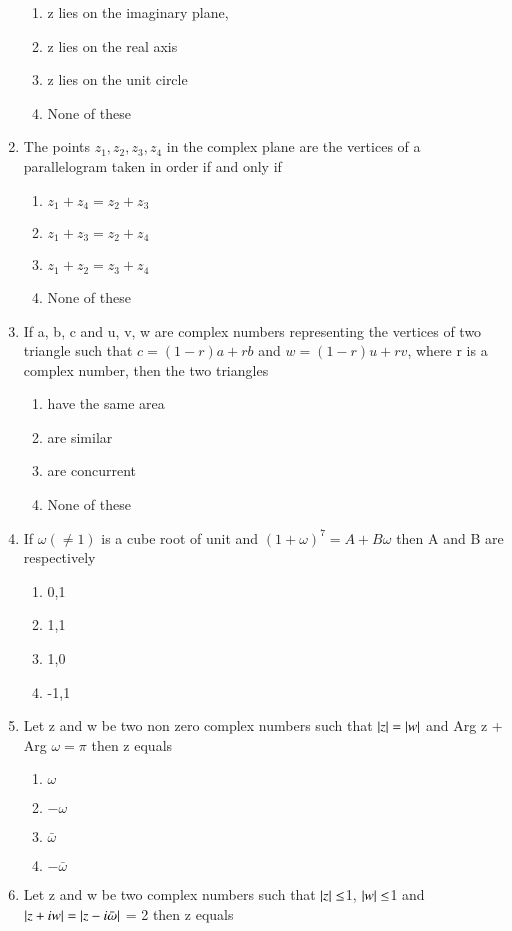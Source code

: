 \begin{enumerate}[label=\arabic*.,ref=\thesubsection.\theenumi]
\begin{enumerate}
    \item  z lies on the imaginary plane,
    \item  z lies on the real axis
    \item  z lies on the unit circle
    \item  None of these
    \end{enumerate}
    \item The points $z_1, z_2, z_3, z_4$ in the complex plane are the vertices of a parallelogram taken in order if and only if
    \begin{enumerate}
     \item $z_1+z_4=z_2+z_3$
    \item  $z_1+z_3=z_2+z_4$
    \item  $z_1+z_2=z_3+z_4$
    \item None of these
    \end{enumerate}
    \item If a, b, c and u, v, w are complex numbers representing the vertices of two triangle such that 
    $c = (1-r)a + rb$ and $w = (1-r)u + rv$, where r is a complex number, then the two triangles
    \begin{enumerate}
    \item have the same area
    \item  are similar
    \item  are concurrent 
    \item None of these
    \end{enumerate}
    \item If $\omega(\neq1)$ is a cube root of unit and $(1+\omega)^7 = A+B \omega$ then A and B are respectively 
    \begin{enumerate}
    \item 0,1
    \item  1,1
    \item  1,0 
    \item -1,1
    \end{enumerate}
    \item Let z and w be two non zero complex numbers such that $\left\vert z\right\vert = \left\vert w\right\vert $ and Arg z + Arg $\omega=\pi$ then z equals
    \begin{enumerate}
    \item  $\omega$
    \item  $-\omega$
    \item  $\bar\omega$
    \item  $-\bar\omega$
    \end{enumerate}
    \item Let z and w be two complex numbers such that $\left\vert z\right\vert\leq$1, $\left\vert w\right\vert\leq$1 and $\left\vert z+iw\right\vert = \left\vert z-i\bar\omega\right\vert$ = 2 then z equals 

\end{enumerate}
